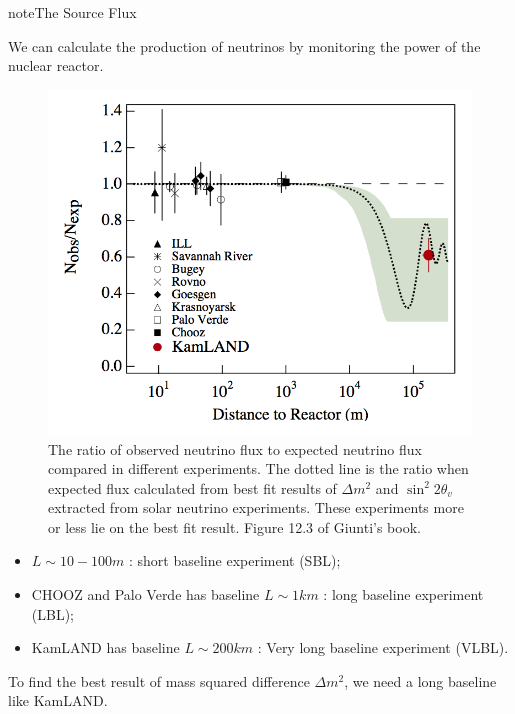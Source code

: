 \documentclass[letterpaper,12pt,english]{sphinxmanual}
\begin{document}
\begin{notice}{note}{The Source Flux}

We can calculate the production of neutrinos by monitoring the power of the nuclear reactor.
\end{notice}
\begin{figure}[htbp]
\centering
\capstart

\includegraphics{reactorExpBaseline.png}
\caption{The ratio of observed neutrino flux to expected neutrino flux compared in different experiments. The dotted line is the ratio when expected flux calculated from best fit results of \(\Delta m^2\) and \(\sin^2 2\theta_v\) extracted from solar neutrino experiments. These experiments more or less lie on the best fit result. Figure 12.3 of Giunti's book.}\end{figure}
\begin{itemize}
\item {} 
\(L\sim 10 - 100 m\) : short baseline experiment (SBL);

\item {} 
CHOOZ and Palo Verde has baseline \(L\sim 1km\) : long baseline experiment (LBL);

\item {} 
KamLAND has baseline \(L\sim 200km\) : Very long baseline experiment (VLBL).

\end{itemize}

To find the best result of mass squared difference \(\Delta m^2\), we need a long baseline like KamLAND.
\end{document}
